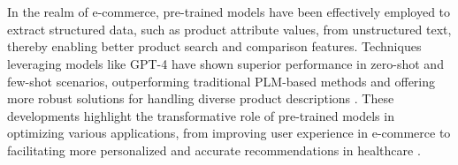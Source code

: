 \\\\
In the realm of e-commerce, pre-trained models have been effectively employed to extract structured data, such as product attribute values, from unstructured text, thereby enabling better product search and comparison features. Techniques leveraging models like GPT-4 have shown superior performance in zero-shot and few-shot scenarios, outperforming traditional PLM-based methods and offering more robust solutions for handling diverse product descriptions \cite{brinkmann2024product}. These developments highlight the transformative role of pre-trained models in optimizing various applications, from improving user experience in e-commerce to facilitating more personalized and accurate recommendations in healthcare \cite{labrak2024biomistral}.

